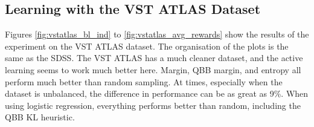 \subsection{Learning with the VST ATLAS Dataset}
\label{sub:learnvstatlas}

Figures \ref{fig:vstatlas_bl_ind} to \ref{fig:vstatlas_avg_rewards} show the results of the experiment on the VST ATLAS dataset.
The organisation of the plots is the same as the SDSS.
The VST ATLAS has a much cleaner dataset, and the active learning seems to work
much better here. Margin, QBB margin, and entropy all perform much better than random sampling.
At times, especially when the dataset is unbalanced, the difference in performance can
be as great as 9\%. When using logistic regression, everything performs better
than random, including the QBB KL heuristic.


